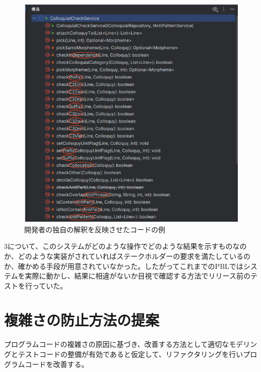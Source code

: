 \documentclass[12pt, a4paper]{jreport}
\begin{document}
\begin{figure}[H]
\centering
\includegraphics[width=1\linewidth]{image/genin2.1.png}
\caption{開発者の独自の解釈を反映させたコードの例}
\label{fig:enter-label}
\end{figure}
3について、このシステムがどのような操作でどのような結果を示すものなのか、どのような実装がされていればステークホルダーの要求を満たしているのか、確かめる手段が用意されていなかった。したがってこれまでのPBLではシステムを実際に動かし、結果に相違がないか目視で確認する方法でリリース前のテストを行っていた。
\section{複雑さの防止方法の提案}
プログラムコードの複雑さの原因に基づき、改善する方法として適切なモデリングとテストコードの整備が有効であると仮定して、リファクタリングを行いプログラムコードを改善する。
\end{document}
